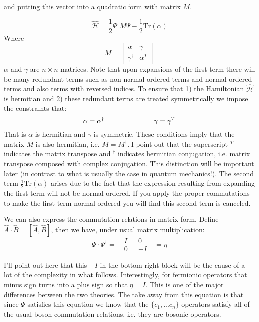 \documentclass[12pt]{article}
\begin{document}
and putting this vector into a quadratic form with matrix $M$.

\begin{equation} \label{origham} \hat{\mathcal{H}} = \frac{1}{2} \Psi^{\dag} M \Psi - \frac{1}{2} \text{Tr}(\alpha) \end{equation} 
Where
\begin{equation}
M = 
\begin{bmatrix}
\alpha & \gamma\\
\gamma^{\dag} & \alpha^T
\end{bmatrix}
\end{equation}
$\alpha$ and $\gamma$ are $n \times n$ matrices.
Note that upon expansions of the first term there will be many redundant terms such as non-normal ordered terms and normal ordered terms and also terms with reversed indices. To ensure that 1) the Hamiltonian $\hat{\mathcal{H}}$ is hermitian and 2) these redundant terms are treated symmetrically we impose the constraints that:
\begin{equation} \alpha = \alpha^{\dagger} \hspace{1 in} \gamma = \gamma^T \end{equation}
That is $\alpha$ is hermitian and $\gamma$ is symmetric. These conditions imply that the matrix $M$ is also hermitian, i.e. $M = M^{\dagger}$. I point out that the superscript $^T$ indicates the matrix transpose and $^\dagger$ indicates hermitian conjugation, i.e. matrix transpose composed with complex conjugation. This distinction will be important later (in contrast to what is usually the case in quantum mechanics!). The second term $\frac{1}{2}\text{Tr}(\alpha)$ arises due to the fact that the expression resulting from expanding the first term will not be normal ordered. If you apply the proper commutations to make the first term normal ordered you will find this second term is canceled.

We can also express the commutation relations in matrix form. Define $\hat{A}\cdot\hat{B} = [\hat{A},\hat{B}]$, then we have, under usual matrix multiplication:
\begin{equation}
\label{Psicomrel}
\Psi \cdot \Psi^{\dagger} = 
\begin{bmatrix}
I && 0\\
0 && -I
\end{bmatrix} = \eta \end{equation}

I'll point out here that this $-I$ in the bottom right block will be the cause of a lot of the complexity in what follows. Interestingly, for fermionic operators that minus sign turns into a plus sign so that $\eta = I$. This is one of the major differences between the two theories. The take away from this equation is that since $\Psi$ satisfies this equation we know that the $\{c_1, ... c_n\}$ operators satisfy all of the usual boson commutation relations, i.e. they are bosonic operators.
\end{document}
